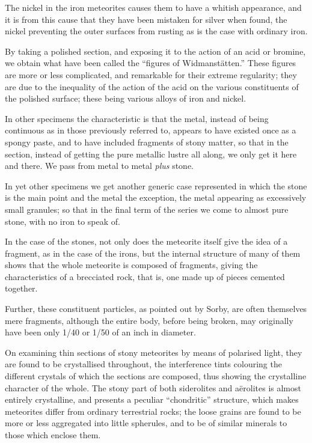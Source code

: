 \documentclass[a4paper, 12pt, oneside, polutonikogreek, english]{article}
\begin{document}
The nickel in the iron meteorites causes them to have a whitish appearance, and it is from this cause that they have been mistaken for silver when found, the nickel preventing the outer surfaces from rusting as is the case with ordinary iron.

By taking a polished section, and exposing it to the action of an acid or bromine, we obtain what have been called the ``figures of Widmanstätten.'' These figures are more or less complicated, and remarkable for their extreme regularity; they are due to the inequality of the action of the acid on the various constituents of the polished surface; these being various alloys of iron and nickel.

In other specimens the characteristic is that the metal, instead of being continuous as in those previously referred to, appears to have existed once as a spongy paste, and to have included fragments of stony matter, so that in the section, instead of getting the pure metallic lustre all along, we only get it here and there. We pass from metal to metal \emph{plus} stone.

In yet other specimens we get another generic case represented in which the stone is the main point and the metal the exception, the metal appearing as excessively small granules; so that in the final term of the series we come to almost pure stone, with no iron to speak of.

In the case of the stones, not only does the meteorite itself give the idea of a fragment, as in the case of the irons, but the internal structure of many of them shows that the whole meteorite is composed of fragments, giving the characteristics of a brecciated rock, that is, one made up of pieces cemented together.

Further, these constituent particles, as pointed out by Sorby, are often themselves mere fragments, although the entire body, before being broken, may originally have been only 1/40 or 1/50 of an inch in diameter.

On examining thin sections of stony meteorites by means of polarised light, they are found to be crystallised throughout, the interference tints colouring the different crystals of which the sections are composed, thus showing the crystalline character of the whole. The stony part of both siderolites and aërolites is almost entirely crystalline, and presents a peculiar ``chondritic'' structure, which makes meteorites differ from ordinary terrestrial rocks; the loose grains are found to be more or less aggregated into little spherules, and to be of similar minerals to those which enclose them.
\end{document}

